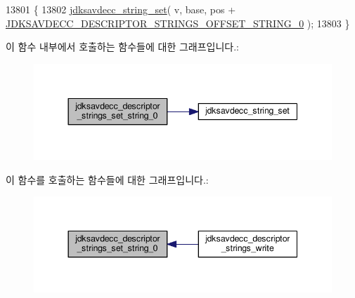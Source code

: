 \begin{DoxyCode}
13801 \{
13802     \hyperlink{group__string_gaffb2c926e982b532e0657e814afc0395}{jdksavdecc\_string\_set}( v, base, pos + 
      \hyperlink{group__descriptor__strings_gab9913a38c283200ad176d5101dfa248f}{JDKSAVDECC\_DESCRIPTOR\_STRINGS\_OFFSET\_STRING\_0} );
13803 \}
\end{DoxyCode}


이 함수 내부에서 호출하는 함수들에 대한 그래프입니다.\+:
\nopagebreak
\begin{figure}[H]
\begin{center}
\leavevmode
\includegraphics[width=344pt]{group__descriptor__strings_ga612bb2728d694ba394037a3dfe518213_cgraph}
\end{center}
\end{figure}




이 함수를 호출하는 함수들에 대한 그래프입니다.\+:
\nopagebreak
\begin{figure}[H]
\begin{center}
\leavevmode
\includegraphics[width=344pt]{group__descriptor__strings_ga612bb2728d694ba394037a3dfe518213_icgraph}
\end{center}
\end{figure}


